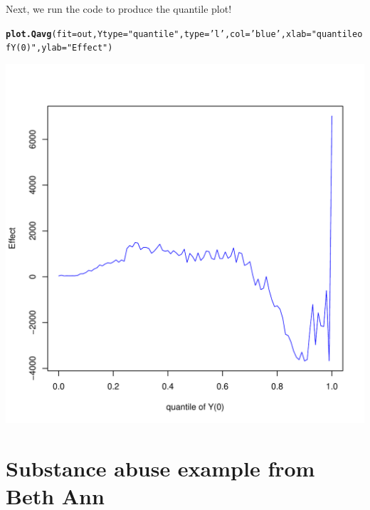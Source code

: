 \documentclass{article}\usepackage[]{graphicx}\usepackage[]{color}
\makeatletter
\def\maxwidth{ %
  \ifdim\Gin@nat@width>\linewidth
    \linewidth
  \else
    \Gin@nat@width
  \fi
}
\newcommand{\hlstr}[1]{\textcolor[rgb]{0.192,0.494,0.8}{#1}}%
\newcommand{\hlstd}[1]{\textcolor[rgb]{0.345,0.345,0.345}{#1}}%
\newcommand{\hlkwc}[1]{\textcolor[rgb]{0.333,0.667,0.333}{#1}}%
\newcommand{\hlkwd}[1]{\textcolor[rgb]{0.737,0.353,0.396}{\textbf{#1}}}%
\newenvironment{kframe}{%
 \def\at@end@of@kframe{}%
 \ifinner\ifhmode%
  \def\at@end@of@kframe{\end{minipage}}%
  \begin{minipage}{\columnwidth}%
 \fi\fi%
 \def\FrameCommand##1{\hskip\@totalleftmargin \hskip-\fboxsep
 \colorbox{shadecolor}{##1}\hskip-\fboxsep
     \hskip-\linewidth \hskip-\@totalleftmargin \hskip\columnwidth}%
 \MakeFramed {\advance\hsize-\width
   \@totalleftmargin\z@ \linewidth\hsize
   \@setminipage}}%
 {\par\unskip\endMakeFramed%
 \at@end@of@kframe}
\newenvironment{knitrout}{}{} %
\makeatother
\begin{document}
Next, we run the code to produce the quantile plot!
\begin{knitrout}
\color{fgcolor}\begin{kframe}
\begin{alltt}
\hlkwd{plot.Qavg}\hlstd{(}\hlkwc{fit}\hlstd{=out ,} \hlkwc{Ytype}\hlstd{=}\hlstr{"quantile"} \hlstd{,} \hlkwc{type}\hlstd{=}\hlstr{'l'} \hlstd{,} \hlkwc{col}\hlstd{=}\hlstr{'blue'} \hlstd{,} \hlkwc{xlab}\hlstd{=}\hlstr{"quantile of Y(0)"} \hlstd{,} \hlkwc{ylab}\hlstd{=}\hlstr{"Effect"}\hlstd{)}
\end{alltt}
\end{kframe}

{\centering \includegraphics[width=\maxwidth]{figures/lalonde-Qplot-1} 

}



\end{knitrout}


\section{Substance abuse example from Beth Ann}
\end{document}
